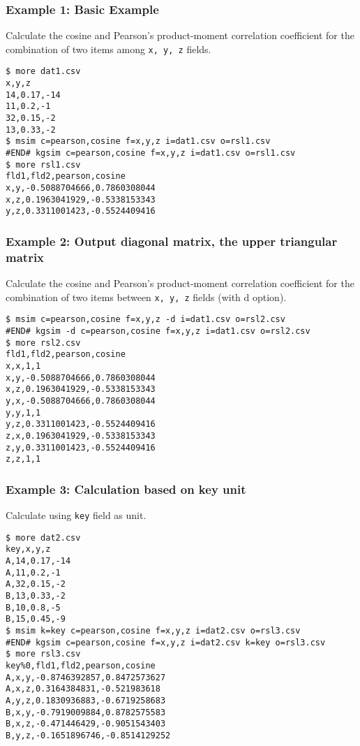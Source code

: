 \subsubsection*{Example 1: Basic Example}

Calculate the cosine and Pearson's product-moment correlation coefficient for the combination of two items among \verb|x, y, z| fields.


\begin{Verbatim}[baselinestretch=0.7,frame=single]
$ more dat1.csv
x,y,z
14,0.17,-14
11,0.2,-1
32,0.15,-2
13,0.33,-2
$ msim c=pearson,cosine f=x,y,z i=dat1.csv o=rsl1.csv
#END# kgsim c=pearson,cosine f=x,y,z i=dat1.csv o=rsl1.csv
$ more rsl1.csv
fld1,fld2,pearson,cosine
x,y,-0.5088704666,0.7860308044
x,z,0.1963041929,-0.5338153343
y,z,0.3311001423,-0.5524409416
\end{Verbatim}
\subsubsection*{Example 2: Output diagonal matrix, the upper triangular matrix}

Calculate the cosine and Pearson's product-moment correlation coefficient for the combination of two items between \verb|x, y, z|  fields (with d option).


\begin{Verbatim}[baselinestretch=0.7,frame=single]
$ msim c=pearson,cosine f=x,y,z -d i=dat1.csv o=rsl2.csv
#END# kgsim -d c=pearson,cosine f=x,y,z i=dat1.csv o=rsl2.csv
$ more rsl2.csv
fld1,fld2,pearson,cosine
x,x,1,1
x,y,-0.5088704666,0.7860308044
x,z,0.1963041929,-0.5338153343
y,x,-0.5088704666,0.7860308044
y,y,1,1
y,z,0.3311001423,-0.5524409416
z,x,0.1963041929,-0.5338153343
z,y,0.3311001423,-0.5524409416
z,z,1,1
\end{Verbatim}
\subsubsection*{Example 3: Calculation based on key unit}

Calculate using \verb|key| field as unit.


\begin{Verbatim}[baselinestretch=0.7,frame=single]
$ more dat2.csv
key,x,y,z
A,14,0.17,-14
A,11,0.2,-1
A,32,0.15,-2
B,13,0.33,-2
B,10,0.8,-5
B,15,0.45,-9
$ msim k=key c=pearson,cosine f=x,y,z i=dat2.csv o=rsl3.csv
#END# kgsim c=pearson,cosine f=x,y,z i=dat2.csv k=key o=rsl3.csv
$ more rsl3.csv
key%0,fld1,fld2,pearson,cosine
A,x,y,-0.8746392857,0.8472573627
A,x,z,0.3164384831,-0.521983618
A,y,z,0.1830936883,-0.6719258683
B,x,y,-0.7919009884,0.8782575583
B,x,z,-0.471446429,-0.9051543403
B,y,z,-0.1651896746,-0.8514129252
\end{Verbatim}
